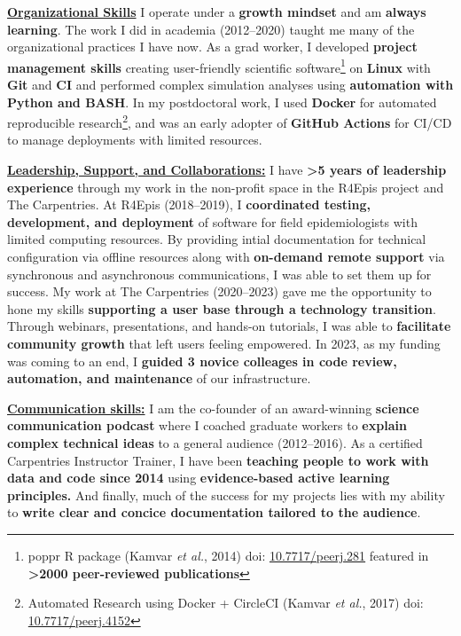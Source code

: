 \vspace{2ex}

\underline{\textbf{Organizational Skills}}
I operate under a \textbf{growth mindset} and am \textbf{always learning}.
The work I did in academia (2012--2020) taught me many of the organizational practices I have now.
As a grad worker, I developed \textbf{project management skills} creating user-friendly scientific software\footnote{poppr R package (Kamvar \textit{et al.}, 2014) doi: \href{https://doi.org/10.7717/peerj.281}{10.7717/peerj.281} featured in \textbf{\textgreater2000 peer-reviewed publications}} on \textbf{Linux} with \textbf{Git} and \textbf{CI} and 
performed complex simulation analyses using \textbf{automation with Python and BASH}.
In my postdoctoral work, I used \textbf{Docker} for automated reproducible research\footnote{Automated Research using Docker + CircleCI (Kamvar \textit{et al.}, 2017) doi: \href{https://doi.org/10.7717/peerj.4152}{10.7717/peerj.4152}}, 
and was an early adopter of \textbf{GitHub Actions} for CI/CD to manage deployments with limited resources.

\vspace{2ex}

\underline{\textbf{Leadership, Support, and Collaborations:}}
I have \textbf{\textgreater5 years of leadership experience} through my work in the non-profit space in the R4Epis project and The Carpentries.
At R4Epis (2018--2019), I \textbf{coordinated testing, development, and deployment} of software for field epidemiologists with limited computing resources.
By providing intial documentation for technical configuration via offline resources along with \textbf{on-demand remote support} via synchronous and asynchronous communications, I was able to set them up for success.
My work at The Carpentries (2020--2023) gave me the opportunity to hone my skills \textbf{supporting a user base through a technology transition}. Through webinars, presentations, and hands-on tutorials, I was able to \textbf{facilitate community growth} that left users feeling empowered.
In 2023, as my funding was coming to an end, I \textbf{guided 3 novice colleages in code review, automation, and maintenance} of our infrastructure.


\vspace{2ex}

\underline{\textbf{Communication skills:}}
I am the co-founder of an award-winning \textbf{science communication podcast} where I coached graduate workers to \textbf{explain complex technical ideas} to a general audience (2012--2016).
As a certified Carpentries Instructor Trainer, I have been \textbf{teaching people to work with data and code since 2014} using \textbf{evidence-based active learning principles.} 
And finally, much of the success for my projects lies with my ability to \textbf{write clear and concice documentation tailored to the audience}.


